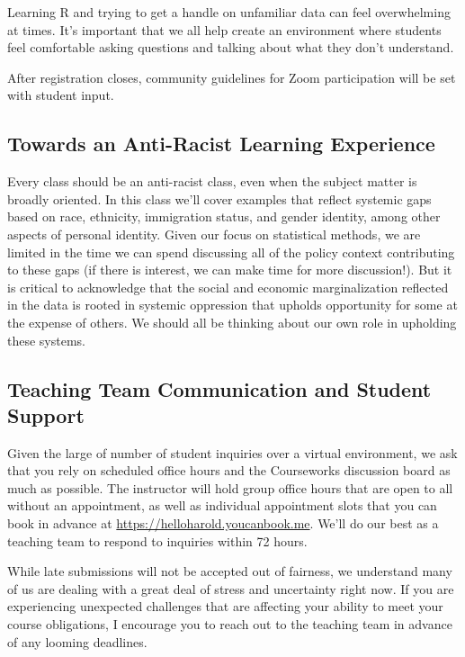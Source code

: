 \documentclass[11pt,]{article}
\begin{document}
Learning R and trying to get a handle on unfamiliar data can feel
overwhelming at times. It's important that we all help create an
environment where students feel comfortable asking questions and talking
about what they don't understand.

After registration closes, community guidelines for Zoom participation
will be set with student input.

\hypertarget{towards-an-anti-racist-learning-experience}{%
\subsection{Towards an Anti-Racist Learning
Experience}\label{towards-an-anti-racist-learning-experience}}

Every class should be an anti-racist class, even when the subject matter
is broadly oriented. In this class we'll cover examples that reflect
systemic gaps based on race, ethnicity, immigration status, and gender
identity, among other aspects of personal identity. Given our focus on
statistical methods, we are limited in the time we can spend discussing
all of the policy context contributing to these gaps (if there is
interest, we can make time for more discussion!). But it is critical to
acknowledge that the social and economic marginalization reflected in
the data is rooted in systemic oppression that upholds opportunity for
some at the expense of others. We should all be thinking about our own
role in upholding these systems.

\hypertarget{teaching-team-communication-and-student-support}{%
\subsection{Teaching Team Communication and Student
Support}\label{teaching-team-communication-and-student-support}}

Given the large of number of student inquiries over a virtual
environment, we ask that you rely on scheduled office hours and the
Courseworks discussion board as much as possible. The instructor will
hold group office hours that are open to all without an appointment, as
well as individual appointment slots that you can book in advance at
\url{https://helloharold.youcanbook.me}. We'll do our best as a teaching
team to respond to inquiries within 72 hours.

While late submissions will not be accepted out of fairness, we
understand many of us are dealing with a great deal of stress and
uncertainty right now. If you are experiencing unexpected challenges
that are affecting your ability to meet your course obligations, I
encourage you to reach out to the teaching team in advance of any
looming deadlines.
\end{document}
